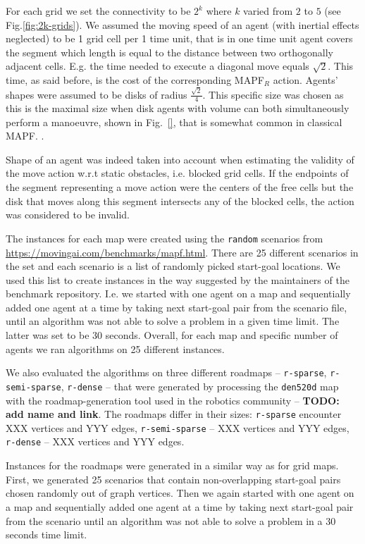 \documentclass[review]{elsarticle}
\newcommand\konstantin[1]{\nb{\textbf{Konstantin:}}{red}{#1}}
\newcommand{\mapfr}{\ac{MAPF}$_R$\xspace}
\newcommand{\mapf}{\ac{MAPF}\xspace}
\begin{document}
For each grid we set the connectivity to be $2^k$ where $k$ varied from $2$ to $5$ (see Fig.\ref{fig:2k-grids}). We assumed the moving speed of an agent (with inertial effects neglected) to be 1 grid cell per 1 time unit, that is in one time unit agent covers the segment which length is equal to the distance between two orthogonally adjacent cells. E.g. the time needed to execute a diagonal move equals $\sqrt{2}$. This time, as said before, is the cost of the corresponding \mapfr action. Agents' shapes were assumed to be disks of radius $ \frac{\sqrt{2}}{4}$. This specific size was chosen as this is the maximal size when disk agents with volume can both simultaneously perform a manoeuvre, shown in Fig.~\ref{}, that is somewhat common in classical \mapf. \konstantin{Not sure how to explain this in elegant way}.

Shape of an agent was indeed taken into account when estimating the validity of the move action w.r.t static obstacles, i.e. blocked grid cells. If the endpoints of the segment representing a move action were the centers of the free cells but the disk that moves along this segment intersects any of the blocked cells, the action was considered to be invalid.

The instances for each map were created using the \texttt{random} scenarios from \url{https://movingai.com/benchmarks/mapf.html}. There are 25 different scenarios in the set and each scenario is a list of randomly picked start-goal locations. We used this list to create instances in the way suggested by the maintainers of the benchmark repository. I.e. we started with one agent on a map and sequentially added one agent at a time by taking next start-goal pair from the scenario file, until an algorithm was not able to solve a problem in a given time limit. The latter was set to be 30 seconds. Overall, for each map and specific number of agents we ran algorithms on 25 different instances.

We also evaluated the algorithms on three different roadmaps -- \texttt{r-sparse}, \texttt{r-semi-sparse}, \texttt{r-dense} -- that were generated by processing the \texttt{den520d} map with the roadmap-generation tool used in the robotics community -- \textbf{TODO: add name and link}. The roadmaps differ in their sizes: \texttt{r-sparse} encounter XXX vertices and YYY edges, \texttt{r-semi-sparse} -- XXX vertices and YYY edges, \texttt{r-dense} -- XXX vertices and YYY edges.

Instances for the roadmaps were generated in a similar way as for grid maps. First, we generated 25 scenarios that contain non-overlapping start-goal pairs chosen randomly out of graph vertices. Then we again started with one agent on a map and sequentially added one agent at a time by taking next start-goal pair from the scenario until an algorithm was not able to solve a problem in a 30 seconds time limit.
\end{document}
